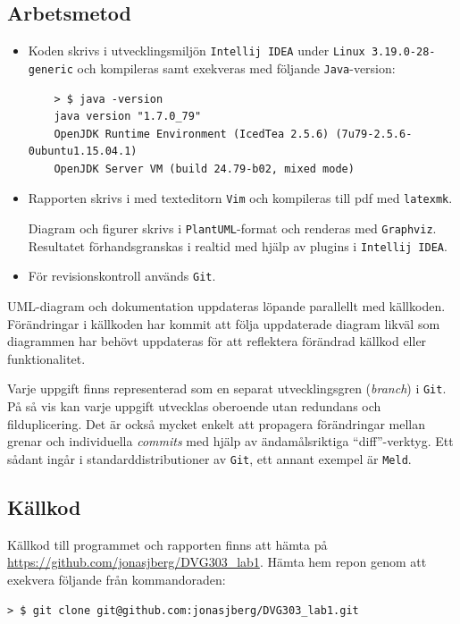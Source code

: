 \subsection*{Arbetsmetod}
\begin{itemize}
    \item Koden skrivs i utvecklingsmiljön \texttt{Intellij IDEA} under
    \texttt{Linux 3.19.0-28-generic} och kompileras samt exekveras med följande
    \texttt{Java}-version:
    \begin{verbatim}
    > $ java -version
    java version "1.7.0_79"
    OpenJDK Runtime Environment (IcedTea 2.5.6) (7u79-2.5.6-0ubuntu1.15.04.1)
    OpenJDK Server VM (build 24.79-b02, mixed mode)
    \end{verbatim}

    \item Rapporten skrivs i \latex med texteditorn \texttt{Vim} och kompileras
    till pdf med \texttt{latexmk}.
    \par Diagram och figurer skrivs i \texttt{PlantUML}-format och renderas med
    \texttt{Graphviz}. Resultatet förhandsgranskas i realtid med hjälp av
    plugins i \texttt{Intellij IDEA}.

    \item För revisionskontroll används \texttt{Git}.
\end{itemize}

UML-diagram och dokumentation uppdateras löpande parallellt med källkoden.
Förändringar i källkoden har kommit att följa uppdaterade diagram likväl som
diagrammen har behövt uppdateras för att reflektera förändrad källkod eller
funktionalitet.
\par Varje uppgift finns representerad som en separat utvecklingsgren
(\emph{branch}) i \texttt{Git}. På så vis kan varje uppgift utvecklas oberoende
utan redundans och filduplicering. Det är också mycket enkelt att propagera
förändringar mellan grenar och individuella \emph{commits} med hjälp av
ändamålsriktiga ``diff''-verktyg. Ett sådant ingår i standarddistributioner av
\texttt{Git}, ett annant exempel är \texttt{Meld}.


\subsection*{Källkod}
\par Källkod till programmet och rapporten finns att hämta på
\url{https://github.com/jonasjberg/DVG303_lab1}.
Hämta hem repon genom att exekvera följande från kommandoraden:
\begin{verbatim}
> $ git clone git@github.com:jonasjberg/DVG303_lab1.git
\end{verbatim}

